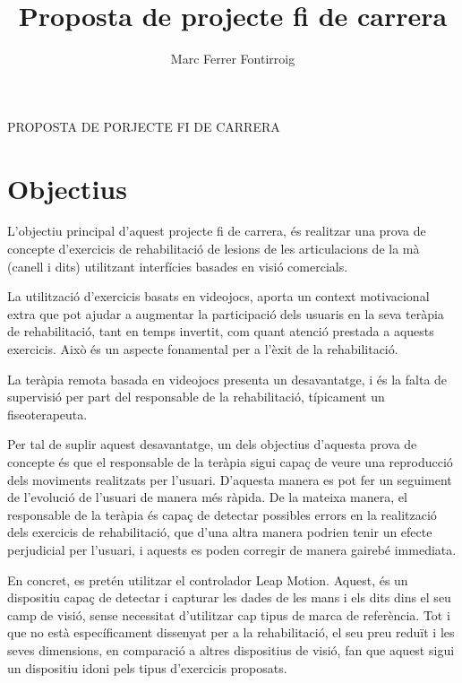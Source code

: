 \documentclass[12pt,a4paper]{article}
\author{Marc Ferrer Fontirroig}
\title{Proposta de projecte fi de carrera}
\begin{document}
	\begin{center}
		\huge PROPOSTA DE PORJECTE FI DE CARRERA
	\end{center}
	\section*{Objectius}
	\thispagestyle{empty}
	L’objectiu principal d’aquest projecte fi de carrera, és realitzar una prova de concepte d’exercicis de rehabilitació de lesions de les articulacions de la mà (canell i dits) utilitzant interfícies basades en visió comercials.
	
	La utilització d’exercicis basats en videojocs, aporta un context motivacional extra que pot ajudar a augmentar la participació dels usuaris en la seva teràpia de rehabilitació, tant en temps invertit, com quant atenció prestada a aquests exercicis. Això és un aspecte fonamental per a l’èxit de la rehabilitació.
	
	La teràpia remota basada en videojocs presenta un desavantatge, i és la falta de supervisió per part del responsable de la rehabilitació, típicament un fiseoterapeuta.
	
	Per tal de suplir aquest desavantatge, un dels objectius d’aquesta prova de concepte és que el responsable de la teràpia sigui capaç de veure una reproducció dels moviments realitzats per l’usuari. D’aquesta manera es pot fer un seguiment de l’evolució de l’usuari de manera més ràpida. De la mateixa manera, el responsable de la teràpia és capaç de detectar possibles errors en la realització dels exercicis de rehabilitació, que d’una altra manera podrien tenir un efecte perjudicial per l’usuari, i aquests es poden corregir de manera gairebé immediata.
	
	En concret, es pretén utilitzar el controlador Leap Motion. Aquest, és un dispositiu capaç de detectar i capturar les dades de les mans i els dits dins el seu camp de visió, sense necessitat d'utilitzar cap tipus de marca de referència. Tot i que no està específicament dissenyat per a la rehabilitació, el seu preu reduït i les seves dimensions, en comparació a altres dispositius de visió, fan que aquest sigui un dispositiu idoni pels tipus d’exercicis proposats.
\end{document}
